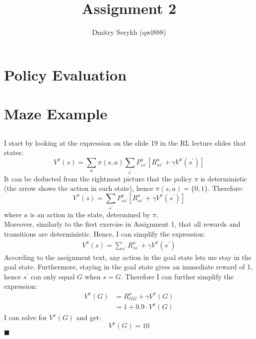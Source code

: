 \documentclass[a4paper]{article}
\title{\vspace{-5cm} Assignment 2}
\author{Dmitry Serykh (qwl888)}
\newcommand*{\QEDA}{\hfill\ensuremath{\blacksquare}}%
\begin{document}
\maketitle
\section{Policy Evaluation}
\label{sec:1}
\newpage


\section{Maze Example}
\label{sec:2}
\subsection{}
\label{subsec:21}
I start by looking at the expression on the slide 19 in the RL lecture slides that states:
\[
V^{\pi}(s)
=\sum_{a} \pi(s, a) \sum_{s^{\prime}} P_{s s^{\prime}}^{a}
\left[R_{s s^{\prime}}^{a}+\gamma V^{\pi}\left(s^{\prime}\right)\right]
\]
It can be deducted from the rightmost picture that the policy $\pi$ is
deterministic (the arrow shows the action in each state), hence
$\pi(s,a) = \{0,1\}$. Therefore:
\[
V^{\pi}(s) =\sum_{s^{\prime}} P_{s s^{\prime}}^{a}
\left[R_{s s^{\prime}}^{a}+\gamma V^{\pi}\left(s^{\prime}\right)\right]
\]
where $a$ is an action in the state, determined by $\pi$.\\
Moreover, similarly to the first exercise in Assignment 1, that all rewards and
transitions are deterministic. Hence, I can simplify the expression:
\begin{align}
  \label{V_pi}
  V^{\pi}(s) = \sum_{s^{\prime}} R_{s s^{\prime}}^{a}+\gamma V^{\pi}\left(s^{\prime}\right)
\end{align}
According to the assignment text, any action in the goal state lets me stay in
the goal state. Furthermore, staying in the goal state gives an immediate reward of 1,
hence $s^{\prime}$ can only equal $G$ when $s = G$. Therefore I can further simplify
the expression:
\begin{align*}
  V^{\pi}(G) &= R_{G G}^{a}+\gamma V^{\pi}\left(G\right) \\
  &= 1 + 0.9 \cdot V^{\pi}(G)
\end{align*}
I can solve for $V^{\pi}(G)$ and get:
\[
V^{\pi}(G) = 10
\]
\QEDA
\end{document}
